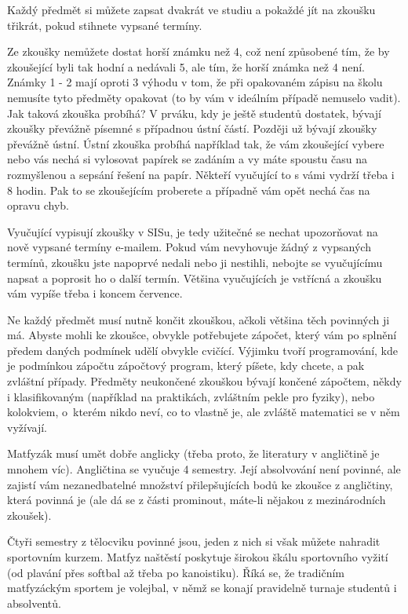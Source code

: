 Každý předmět si můžete zapsat dvakrát ve studiu a pokaždé jít na zkoušku
třikrát, pokud stihnete vypsané termíny.

Ze zkoušky nemůžete dostat horší známku než 4, což není způsobené tím, že by
zkoušející byli tak hodní a nedávali 5, ale tím, že horší známka než 4 není.
Známky 1 - 2 mají oproti 3 výhodu v tom, že při opakovaném zápisu na školu
nemusíte tyto předměty opakovat (to by vám v ideálním případě nemuselo vadit).
Jak taková zkouška probíhá? V prváku, kdy je ještě studentů dostatek, bývají
zkoušky převážně písemné s případnou ústní částí. Později už bývají zkoušky
převážně ústní. Ústní zkouška probíhá například tak, že vám zkoušející vybere
nebo vás nechá si vylosovat papírek se zadáním a vy máte spoustu času na
rozmyšlenou a sepsání řešení na papír. Někteří vyučující to s vámi vydrží třeba
i 8 hodin. Pak to se zkoušejícím proberete a případně vám opět nechá čas na
opravu chyb.

Vyučující vypisují zkoušky v SISu, je tedy užitečné se nechat upozorňovat na
nově vypsané termíny e-mailem. Pokud vám nevyhovuje žádný z vypsaných termínů,
zkoušku jste napoprvé nedali nebo ji nestihli, nebojte se vyučujícímu napsat a
poprosit ho o další termín. Většina vyučujících je vstřícná a zkoušku vám vypíše
třeba i koncem července.

Ne každý předmět musí nutně končit zkouškou, ačkoli většina těch povinných ji
má. Abyste mohli ke zkoušce, obvykle potřebujete zápočet, který vám po splnění
předem daných podmínek udělí obvykle cvičící. Výjimku tvoří programování, kde je
podmínkou zápočtu zápočtový program, který píšete, kdy chcete, a pak zvláštní
případy. Předměty neukončené zkouškou bývají končené zápočtem, někdy i
klasifikovaným (například na praktikách, zvláštním pekle pro fyziky), nebo
kolokviem, o~kterém nikdo neví, co to vlastně je, ale zvláště matematici se v
něm vyžívají.

Matfyzák musí umět dobře anglicky (třeba proto, že literatury v angličtině je
mnohem víc). Angličtina se vyučuje 4 semestry. Její absolvování není povinné,
ale zajistí vám nezanedbatelné množství přilepšujících bodů ke zkoušce z
angličtiny, která povinná je (ale dá se z části prominout, máte-li nějakou z
mezinárodních zkoušek).

Čtyři semestry z tělocviku povinné jsou, jeden z nich si však můžete nahradit
sportovním kurzem. Matfyz naštěstí poskytuje širokou škálu sportovního vyžití
(od plavání přes softbal až třeba po kanoistiku). Říká se, že tradičním
matfyzáckým sportem je volejbal, v němž se konají pravidelně turnaje studentů i
absolventů.

